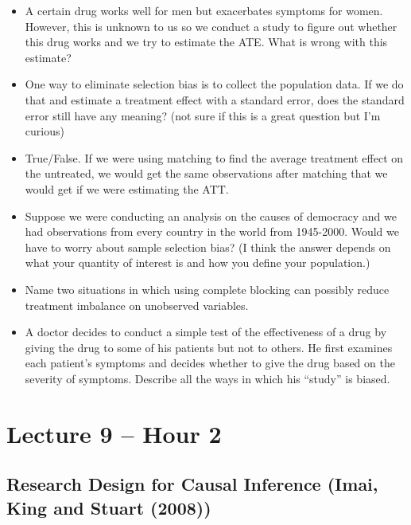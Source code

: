 \documentclass[11pt]{article}
\begin{document}
\begin{itemize}
\item A certain drug works well for men but exacerbates symptoms for women.  However, this is unknown to us so we conduct a study to figure out whether this drug works and we try to estimate the ATE.  What is wrong with this estimate?

\item One way to eliminate selection bias is to collect the population data.  If we do that and estimate a treatment effect with a standard error, does the standard error still have any meaning?  (not sure if this is a great question but I'm curious)

\item True/False.  If we were using matching to find the average treatment effect on the untreated, we would get the same observations after matching that we would get if we were estimating the ATT.

\item Suppose we were conducting an analysis on the causes of democracy and we had observations from every country in the world from 1945-2000.  Would we have to worry about sample selection bias?  (I think the answer depends on what your quantity of interest is and how you define your population.)

\item Name two situations in which using complete blocking can possibly reduce treatment imbalance on unobserved variables.

\item A doctor decides to conduct a simple test of the effectiveness of a drug by giving the drug to some of his patients but not to others.  He first examines each patient's symptoms and decides whether to give the drug based on the severity of symptoms.  Describe all the ways in which his ``study'' is biased.


\end{itemize}

\section{Lecture 9 -- Hour 2}

\subsection{Research Design for Causal Inference (Imai, King and Stuart (2008))}
\end{document}
